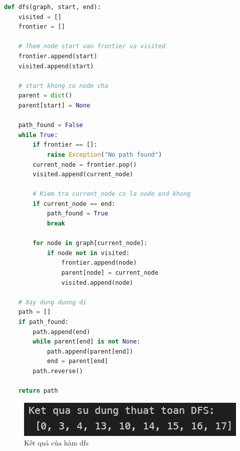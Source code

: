 \documentclass[a4paper, 11pt]{article}
\begin{document}
\begin{lstlisting}[language=Python]
def dfs(graph, start, end):
    visited = []
    frontier = []

    # Them node start vao frontier va visited
    frontier.append(start)
    visited.append(start)

    # start khong co node cha
    parent = dict()
    parent[start] = None

    path_found = False
    while True:
        if frontier == []:
            raise Exception("No path found")
        current_node = frontier.pop()
        visited.append(current_node)

        # Kiem tra current_node co la node end khong
        if current_node == end:
            path_found = True
            break

        for node in graph[current_node]:
            if node not in visited:
                frontier.append(node)
                parent[node] = current_node
                visited.append(node)
    
    # Xay dung duong di
    path = []
    if path_found:
        path.append(end)
        while parent[end] is not None:
            path.append(parent[end])
            end = parent[end]
        path.reverse()
    
    return path
\end{lstlisting}

\begin{figure}[h]
    \centering
    \includegraphics[]{dfs_func.png}
    \caption{Kết quả của hàm dfs}
\end{figure}
\end{document}
